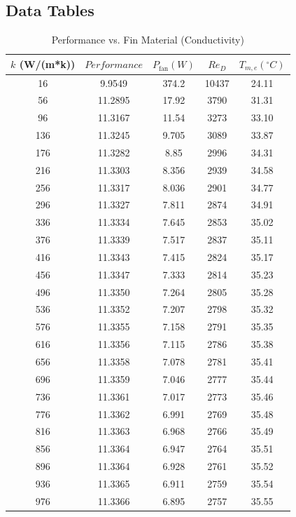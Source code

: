\documentclass[12pt, titlepage]{article}
\begin{document}
\subsection{Data Tables}
\begin{table}[H]
\centering
\caption{Performance vs. Fin Material (Conductivity)}
\begin{tabular}{|c|c|c|c|c|}
\hline
$k$ (W/(m*k)) & $Performance$ & $P_{\mathrm{fan}} (W)$ & $Re_D$ & $T_{m,e} (^\circ C)$ \\
\hline
16 & 9.9549 & 374.2 & 10437 & 24.11 \\\hline
56 & 11.2895 & 17.92 & 3790 & 31.31 \\\hline
96 & 11.3167 & 11.54 & 3273 & 33.10 \\\hline
136 & 11.3245 & 9.705 & 3089 & 33.87 \\\hline
176 & 11.3282 & 8.85 & 2996 & 34.31 \\\hline
216 & 11.3303 & 8.356 & 2939 & 34.58 \\\hline
256 & 11.3317 & 8.036 & 2901 & 34.77 \\\hline
296 & 11.3327 & 7.811 & 2874 & 34.91 \\\hline
336 & 11.3334 & 7.645 & 2853 & 35.02 \\\hline
376 & 11.3339 & 7.517 & 2837 & 35.11 \\\hline
416 & 11.3343 & 7.415 & 2824 & 35.17 \\\hline
456 & 11.3347 & 7.333 & 2814 & 35.23 \\\hline
496 & 11.3350 & 7.264 & 2805 & 35.28 \\\hline
536 & 11.3352 & 7.207 & 2798 & 35.32 \\\hline
576 & 11.3355 & 7.158 & 2791 & 35.35 \\\hline
616 & 11.3356 & 7.115 & 2786 & 35.38 \\\hline
656 & 11.3358 & 7.078 & 2781 & 35.41 \\\hline
696 & 11.3359 & 7.046 & 2777 & 35.44 \\\hline
736 & 11.3361 & 7.017 & 2773 & 35.46 \\\hline
776 & 11.3362 & 6.991 & 2769 & 35.48 \\\hline
816 & 11.3363 & 6.968 & 2766 & 35.49 \\\hline
856 & 11.3364 & 6.947 & 2764 & 35.51 \\\hline
896 & 11.3364 & 6.928 & 2761 & 35.52 \\\hline
936 & 11.3365 & 6.911 & 2759 & 35.54 \\\hline
976 & 11.3366 & 6.895 & 2757 & 35.55 \\\hline
\end{tabular}
\end{table}
\end{document}
